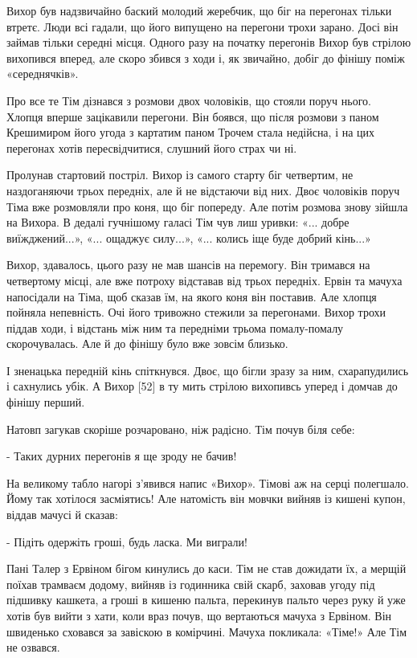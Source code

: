 Вихор був надзвичайно баский молодий жеребчик, що біг на перегонах тільки втретє. Люди всі гадали, що його випущено на перегони трохи зарано. Досі він займав тільки середні місця. Одного разу на початку перегонів Вихор був стрілою вихопився вперед, але скоро збився з ходи і, як звичайно, добіг до фінішу поміж «середнячків».

Про все те Тім дізнався з розмови двох чоловіків, що стояли поруч нього. Хлопця вперше зацікавили перегони. Він боявся, що після розмови з паном Крешимиром його угода з картатим паном Трочем стала недійсна, і на цих перегонах хотів пересвідчитися, слушний його страх чи ні.

Пролунав стартовий постріл. Вихор із самого старту біг четвертим, не наздоганяючи трьох передніх, але й не відстаючи від них. Двоє чоловіків поруч Тіма вже розмовляли про коня, що біг попереду. Але потім розмова знову зійшла на Вихора. В дедалі гучнішому галасі Тім чув лиш уривки: «... добре виїжджений...», «... ощаджує силу...», «... колись іще буде добрий кінь...»

Вихор, здавалось, цього разу не мав шансів на перемогу. Він тримався на четвертому місці, але вже потроху відставав від трьох передніх. Ервін та мачуха напосідали на Тіма, щоб сказав їм, на якого коня він поставив. Але хлопця пойняла непевність. Очі його тривожно стежили за перегонами. Вихор трохи піддав ходи, і відстань між ним та передніми трьома помалу-помалу скорочувалась. Але й до фінішу було вже зовсім близько.

І зненацька передній кінь спіткнувся. Двоє, що бігли зразу за ним, схарапудились і сахнулись убік. А Вихор [52] в ту мить стрілою вихопивсь уперед і домчав до фінішу перший.

Натовп загукав скоріше розчаровано, ніж радісно. Тім почув біля себе:

- Таких дурних перегонів я ще зроду не бачив!

На великому табло нагорі з'явився напис «Вихор». Тімові аж на серці полегшало. Йому так хотілося засміятись! Але натомість він мовчки вийняв із кишені купон, віддав мачусі й сказав:

- Підіть одержіть гроші, будь ласка. Ми виграли!

Пані Талер з Ервіном бігом кинулись до каси. Тім не став дожидати їх, а мерщій поїхав трамваєм додому, вийняв із годинника свій скарб, заховав угоду під підшивку кашкета, а гроші в кишеню пальта, перекинув пальто через руку й уже хотів був вийти з хати, коли враз почув, що вертаються мачуха з Ервіном. Він швиденько сховався за завіскою в комірчині. Мачуха покликала: «Тіме!» Але Тім не озвався.

